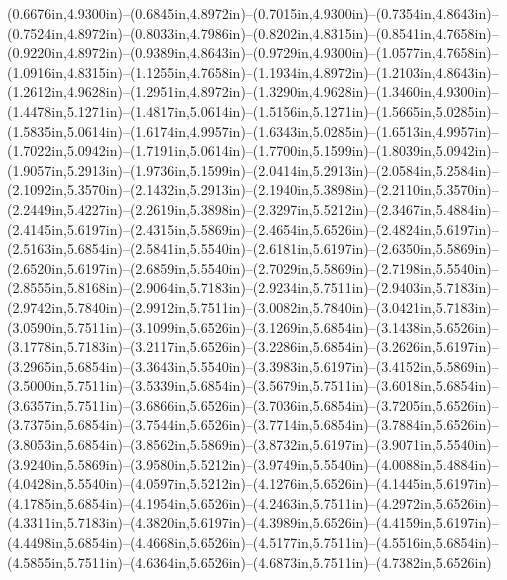 (0.6676in,4.9300in)--(0.6845in,4.8972in)--(0.7015in,4.9300in)--(0.7354in,4.8643in)--(0.7524in,4.8972in)--(0.8033in,4.7986in)--(0.8202in,4.8315in)--(0.8541in,4.7658in)--(0.9220in,4.8972in)--(0.9389in,4.8643in)--(0.9729in,4.9300in)--(1.0577in,4.7658in)--(1.0916in,4.8315in)--(1.1255in,4.7658in)--(1.1934in,4.8972in)--(1.2103in,4.8643in)--(1.2612in,4.9628in)--(1.2951in,4.8972in)--(1.3290in,4.9628in)--(1.3460in,4.9300in)--(1.4478in,5.1271in)--(1.4817in,5.0614in)--(1.5156in,5.1271in)--(1.5665in,5.0285in)--(1.5835in,5.0614in)--(1.6174in,4.9957in)--(1.6343in,5.0285in)--(1.6513in,4.9957in)--(1.7022in,5.0942in)--(1.7191in,5.0614in)--(1.7700in,5.1599in)--(1.8039in,5.0942in)--(1.9057in,5.2913in)--(1.9736in,5.1599in)--(2.0414in,5.2913in)--(2.0584in,5.2584in)--(2.1092in,5.3570in)--(2.1432in,5.2913in)--(2.1940in,5.3898in)--(2.2110in,5.3570in)--(2.2449in,5.4227in)--(2.2619in,5.3898in)--(2.3297in,5.5212in)--(2.3467in,5.4884in)--(2.4145in,5.6197in)--(2.4315in,5.5869in)--(2.4654in,5.6526in)--(2.4824in,5.6197in)--(2.5163in,5.6854in)--(2.5841in,5.5540in)--(2.6181in,5.6197in)--(2.6350in,5.5869in)--(2.6520in,5.6197in)--(2.6859in,5.5540in)--(2.7029in,5.5869in)--(2.7198in,5.5540in)--(2.8555in,5.8168in)--(2.9064in,5.7183in)--(2.9234in,5.7511in)--(2.9403in,5.7183in)--(2.9742in,5.7840in)--(2.9912in,5.7511in)--(3.0082in,5.7840in)--(3.0421in,5.7183in)--(3.0590in,5.7511in)--(3.1099in,5.6526in)--(3.1269in,5.6854in)--(3.1438in,5.6526in)--(3.1778in,5.7183in)--(3.2117in,5.6526in)--(3.2286in,5.6854in)--(3.2626in,5.6197in)--(3.2965in,5.6854in)--(3.3643in,5.5540in)--(3.3983in,5.6197in)--(3.4152in,5.5869in)--(3.5000in,5.7511in)--(3.5339in,5.6854in)--(3.5679in,5.7511in)--(3.6018in,5.6854in)--(3.6357in,5.7511in)--(3.6866in,5.6526in)--(3.7036in,5.6854in)--(3.7205in,5.6526in)--(3.7375in,5.6854in)--(3.7544in,5.6526in)--(3.7714in,5.6854in)--(3.7884in,5.6526in)--(3.8053in,5.6854in)--(3.8562in,5.5869in)--(3.8732in,5.6197in)--(3.9071in,5.5540in)--(3.9240in,5.5869in)--(3.9580in,5.5212in)--(3.9749in,5.5540in)--(4.0088in,5.4884in)--(4.0428in,5.5540in)--(4.0597in,5.5212in)--(4.1276in,5.6526in)--(4.1445in,5.6197in)--(4.1785in,5.6854in)--(4.1954in,5.6526in)--(4.2463in,5.7511in)--(4.2972in,5.6526in)--(4.3311in,5.7183in)--(4.3820in,5.6197in)--(4.3989in,5.6526in)--(4.4159in,5.6197in)--(4.4498in,5.6854in)--(4.4668in,5.6526in)--(4.5177in,5.7511in)--(4.5516in,5.6854in)--(4.5855in,5.7511in)--(4.6364in,5.6526in)--(4.6873in,5.7511in)--(4.7382in,5.6526in) 